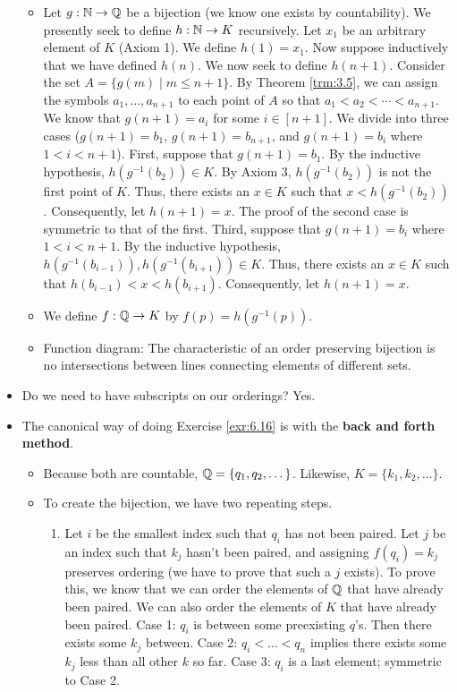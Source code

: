 \documentclass{report}
\begin{document}
\begin{itemize}
\begin{itemize}
        \item Let $g:\mathbb{N}\to\mathbb{Q}$ be a bijection (we know one exists by countability). We presently seek to define $h:\mathbb{N}\to K$ recursively. Let $x_1$ be an arbitrary element of $K$ (Axiom 1). We define $h(1)=x_1$. Now suppose inductively that we have defined $h(n)$. We now seek to define $h(n+1)$. Consider the set $A=\{g(m)\mid m\leq n+1\}$. By Theorem \ref{trm:3.5}, we can assign the symbols $a_1,\dots,a_{n+1}$ to each point of $A$ so that $a_1<a_2<\cdots<a_{n+1}$. We know that $g(n+1)=a_i$ for some $i\in[n+1]$. We divide into three cases ($g(n+1)=b_1$, $g(n+1)=b_{n+1}$, and $g(n+1)=b_i$ where $1<i<n+1$). First, suppose that $g(n+1)=b_1$. By the inductive hypothesis, $h(g^{-1}(b_2))\in K$. By Axiom 3, $h(g^{-1}(b_2))$ is not the first point of $K$. Thus, there exists an $x\in K$ such that $x<h(g^{-1}(b_2))$. Consequently, let $h(n+1)=x$. The proof of the second case is symmetric to that of the first. Third, suppose that $g(n+1)=b_i$ where $1<i<n+1$. By the inductive hypothesis, $h(g^{-1}(b_{i-1})),h(g^{-1}(b_{i+1}))\in K$. Thus, there exists an $x\in K$ such that $h(b_{i-1})<x<h(b_{i+1})$. Consequently, let $h(n+1)=x$.
        \item We define $f:\mathbb{Q}\to K$ by $f(p)=h(g^{-1}(p))$.
        \item Function diagram: The characteristic of an order preserving bijection is no intersections between lines connecting elements of different sets.
    \end{itemize}
    \item Do we need to have subscripts on our orderings? Yes.
    \item The canonical way of doing Exercise \ref{exr:6.16} is with the \textbf{back and forth method}.
    \begin{itemize}
        \item Because both are countable, $\mathbb{Q}=\{q_1,q_2,\dots\}$. Likewise, $K=\{k_1,k_2,\dots\}$.
        \item To create the bijection, we have two repeating steps.
        \begin{enumerate}
            \item Let $i$ be the smallest index such that $q_i$ has not been paired.
            Let $j$ be an index such that $k_j$ hasn't been paired, and assigning $f(q_i)=k_j$ preserves ordering (we have to prove that such a $j$ exists). To prove this, we know that we can order the elements of $\mathbb{Q}$ that have already been paired. We can also order the elements of $K$ that have already been paired. Case 1: $q_i$ is between some preexisting $q$'s. Then there exists some $k_j$ between. Case 2: $q_i<\dots<q_n$ implies there exists some $k_j$ less than all other $k$ so far. Case 3: $q_i$ is a last element; symmetric to Case 2.

\end{enumerate}
\end{itemize}
\end{itemize}
\end{document}
